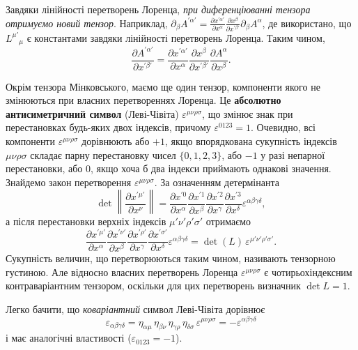 Завдяки лінійності перетворень Лоренца, \textit{при диференціюванні
тензора отримуємо новий тензор}. Наприклад,
$\partial_\beta A^{\prime\alpha'} = \frac{\partial x^{\prime\alpha'}}{\partial x^\alpha}
\frac{\partial x^\beta}{\partial x^{\prime\beta'}} \partial_\beta A^\alpha$,
де використано, що $L^{\mu'}{}_\mu$ є константами завдяки лінійності
перетворень Лоренца. Таким чином,
\[
  \frac{\partial A^{\prime\alpha'}}{\partial x^{\prime\beta'}} =
  \frac{\partial x^{\prime\alpha'}}{\partial x^\alpha}
  \frac{\partial x^\beta}{\partial x^{\prime\beta'}}
  \frac{\partial A^\alpha}{\partial x^\beta}.
\]

Окрім тензора Мінковського, маємо ще один тензор, компоненти якого не
змінюються при власних перетвореннях Лоренца. Це \textbf{абсолютно
антисиметричний символ} (Леві-Чівіта) $\varepsilon^{\mu\nu\rho\sigma}$, що
змінює знак при перестановках будь-яких двох індексів, причому
$\varepsilon^{0123} = 1$.
Очевидно, всі компоненти $\varepsilon^{\mu\nu\rho\sigma}$ дорівнюють
або $+1$, якщо впорядкована сукупність індексів $\mu\nu\rho\sigma$ складає
парну перестановку чисел $\{0,1,2,3\}$, або $-1$ у разі непарної
перестановки, або $0$, якщо хоча б два індекси приймають однакові значення.
Знайдемо закон перетворення $\varepsilon^{\mu\nu\rho\sigma}$.
За означенням детермінанта
\[
  \det\left\|\frac{\partial x^{\prime\mu'}}{\partial x^\nu}\right\|
  = \frac{\partial x^{\prime 0}}{\partial x^\alpha}
    \frac{\partial x^{\prime 1}}{\partial x^\beta}
    \frac{\partial x^{\prime 2}}{\partial x^\gamma}
    \frac{\partial x^{\prime 3}}{\partial x^\delta}
    \varepsilon^{\alpha\beta\gamma\delta},
\]
а після перестановки верхніх індексів $\mu'\nu'\rho'\sigma'$ отримаємо
\[
  \frac{\partial x^{\prime\mu'}}{\partial x^\alpha}
  \frac{\partial x^{\prime\nu'}}{\partial x^\beta}
  \frac{\partial x^{\prime\rho'}}{\partial x^\gamma}
  \frac{\partial x^{\prime\sigma'}}{\partial x^\delta}
  \varepsilon^{\alpha\beta\gamma\delta}
  = \det(L)\,\varepsilon^{\mu'\nu'\rho'\sigma'}.
\]
Сукупність величин, що перетворюються таким чином, називають тензорною
густиною. Але відносно власних перетворень Лоренца $\varepsilon^{\mu\nu\rho\sigma}$
є чотирьохіндексним контраваріантним тензором, оскільки для цих перетворень
визначник $\det L = 1$.

Легко бачити, що \textit{коваріантний} символ Леві-Чівіта дорівнює
\begin{equation*}
  \varepsilon_{\alpha\beta\gamma\delta}
  = \eta_{\alpha\mu}\,\eta_{\beta\nu}\,\eta_{\gamma\rho}\,\eta_{\delta\sigma}\,
    \varepsilon^{\mu\nu\rho\sigma}
  = -\varepsilon^{\alpha\beta\gamma\delta}
\end{equation*}
і має аналогічні властивості ($\varepsilon_{0123} = -1$).

